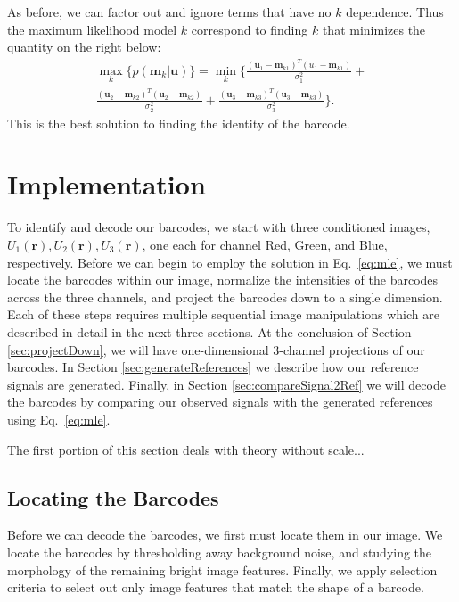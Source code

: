 As before, we can factor out and ignore terms that have no $k$ dependence. Thus the maximum likelihood model $k$ correspond to finding $k$ that minimizes the quantity on the right below:
\begin{multline}\label{eq:mle}
\max_k   \big\{ p(\mathbf{m}_k|\mathbf{u}) \big\} =  \min_k  \Bigg\{  \frac{(\mathbf{u}_1-\mathbf{m}_{k1})^T(u_1-\mathbf{m}_{k1})}{\sigma_1^2} +\\  
\frac{(\mathbf{u}_2-\mathbf{m}_{k2})^T(\mathbf{u}_2-\mathbf{m}_{k2})}{\sigma_2^2} + \frac{(\mathbf{u}_3-\mathbf{m}_{k3})^T(\mathbf{u}_3-\mathbf{m}_{k3})}{\sigma_3^2} \Bigg\}. 
\end{multline}
This is the best solution to finding the identity of the barcode.

\section{Implementation}
To identify and decode our barcodes, we start with three conditioned images, $U_1(\mathbf{r}), U_2(\mathbf{r}), U_3(\mathbf{r})$, one each for channel Red, Green, and Blue, respectively.  Before we can begin to employ the solution in Eq.~\ref{eq:mle}, we must locate the barcodes within our image, normalize the intensities of the barcodes across the three channels, and project the barcodes down to a single dimension. Each of these steps requires multiple sequential image manipulations which are described in detail in the next three sections. At the conclusion of Section \ref{sec:projectDown}, we will  have one-dimensional 3-channel projections of our barcodes. In Section \ref{sec:generateReferences} we describe how our reference signals are generated. Finally, in Section \ref{sec:compareSignal2Ref} we will decode the barcodes by comparing our observed signals with the generated references  using Eq.~\ref{eq:mle}.

The first  portion of this section deals with theory without scale... 

\subsection{Locating the Barcodes} \label{sec:locatingBarcodes}
Before we can decode the barcodes, we first must locate them in our image. We locate the barcodes by thresholding away background noise, and studying the morphology of the remaining bright image features. Finally, we apply selection criteria to select out only image features that match the shape of a barcode. 

